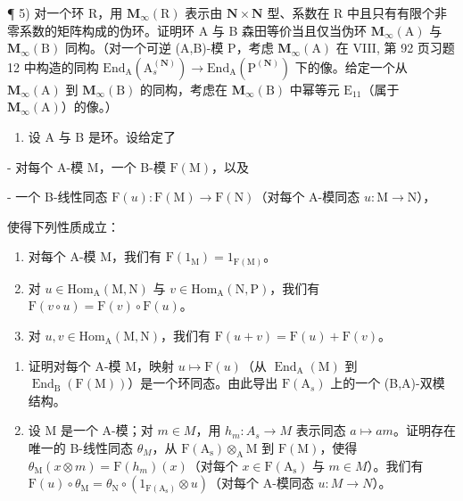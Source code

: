¶ 5) 对一个环 R，用 \(\mathbf{M}_{\infty}(\mathrm{R})\) 表示由 \(\mathbf{N} \times \mathbf{N}\) 型、系数在 R 中且只有有限个非零系数的矩阵构成的伪环。证明环 A 与 B 森田等价当且仅当伪环 \(\mathbf{M}_{\infty}(\mathrm{A})\) 与 \(\mathbf{M}_{\infty}(\mathrm{B})\) 同构。（对一个可逆 (A,B)-模 P，考虑 \(\mathbf{M}_{\infty}(\mathrm{A})\) 在 VIII, 第 92 页习题 12 中构造的同构 \(\mathrm{End}_{\mathrm{A}}(\mathrm{A}_{s}^{(\mathbf{N})}) \to \mathrm{End}_{\mathrm{A}}(\mathrm{P}^{(\mathbf{N})})\) 下的像。给定一个从 \(\mathbf{M}_{\infty}(\mathrm{A})\) 到 \(\mathbf{M}_{\infty}(\mathrm{B})\) 的同构，考虑在 \(\mathbf{M}_{\infty}(\mathrm{B})\) 中幂等元 \(\mathrm{E}_{11}\)（属于 \(\mathbf{M}_{\infty}(\mathrm{A})\)）的像。）

\begin{enumerate}
\def\labelenumi{\arabic{enumi})}
\setcounter{enumi}{5}
\tightlist
\item
  设 \(\mathrm{A}\) 与 \(\mathrm{B}\) 是环。设给定了
\end{enumerate}

- 对每个 A-模 M，一个 B-模 \(\mathrm{F(M)}\)，以及

- 一个 B-线性同态 \(\mathrm{F}(u): \mathrm{F}(\mathrm{M}) \to \mathrm{F}(\mathrm{N})\)（对每个 A-模同态 \(u: \mathrm{M} \to \mathrm{N}\)），

使得下列性质成立：

\begin{enumerate}
\def\labelenumi{(\roman{enumi})}
\item
  对每个 A-模 M，我们有 \(\mathrm{F}(1_{\mathrm{M}}) = 1_{\mathrm{F(M)}}\)。
\item
  对 \(u \in \mathrm{Hom}_{\mathrm{A}}(\mathrm{M}, \mathrm{N})\) 与 \(v \in \mathrm{Hom}_{\mathrm{A}}(\mathrm{N}, \mathrm{P})\)，我们有 \(\mathrm{F}(v \circ u) = \mathrm{F}(v) \circ \mathrm{F}(u)\)。
\item
  对 \(u, v \in \mathrm{Hom}_{\mathrm{A}}(\mathrm{M}, \mathrm{N})\)，我们有 \(\mathrm{F}(u + v) = \mathrm{F}(u) + \mathrm{F}(v)\)。
\end{enumerate}

\begin{enumerate}
\def\labelenumi{\alph{enumi})}
\item
  证明对每个 A-模 M，映射 \(u \mapsto \mathrm{F}(u)\)（从 \(\operatorname{End}_{\mathrm{A}}(\mathrm{M})\) 到 \(\operatorname{End}_{\mathrm{B}}(\mathrm{F}(\mathrm{M}))\)）是一个环同态。由此导出 \(\mathrm{F}(\mathrm{A}_{s})\) 上的一个 (B,A)-双模结构。
\item
  设 M 是一个 A-模；对 \(m \in M\)，用 \(h_{m} : A_{s} \to M\) 表示同态 \(a \mapsto am\)。证明存在唯一的 B-线性同态 \(\theta_{M}\)，从 \(\mathrm{F(A_{s})} \otimes_{\mathrm{A}} \mathrm{M}\) 到 \(\mathrm{F(M)}\)，使得 \(\theta_{\mathrm{M}}(x \otimes m) = \mathrm{F}(h_{m})(x)\)（对每个 \(x \in \mathrm{F(A_{s})}\) 与 \(m \in M\)）。我们有 \(\mathrm{F}(u) \circ \theta_{\mathrm{M}} = \theta_{\mathrm{N}} \circ (1_{\mathrm{F(A_{s})}} \otimes u)\)（对每个 A-模同态 \(u : M \to N\)）。
\end{enumerate}

